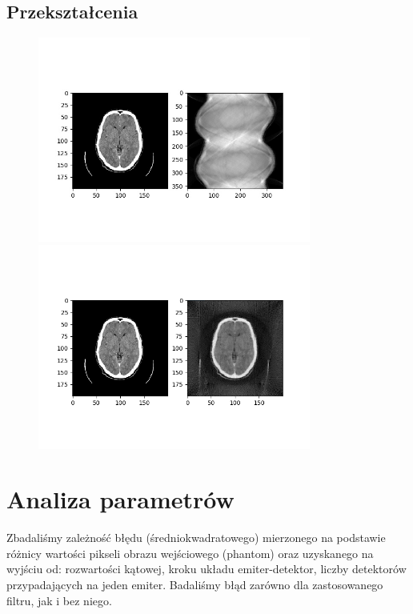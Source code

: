\documentclass{article}
\begin{document}
\subsection{Przekształcenia}
\begin{figure}[H]
\begin{center}
\includegraphics[width=0.8\textwidth]{./brain/sinogram.jpg}
\includegraphics[width=0.8\textwidth]{./brain/reconstructedImg2.png}
\end{center}
\end{figure}

\section{Analiza parametrów}

Zbadaliśmy zależność błędu (średniokwadratowego) mierzonego na podstawie różnicy wartości pikseli obrazu wejściowego (phantom) oraz uzyskanego na wyjściu od: rozwartości kątowej, kroku układu emiter-detektor, liczby detektorów przypadających na jeden emiter. Badaliśmy błąd zarówno dla zastosowanego filtru, jak i bez niego.
\end{document}
